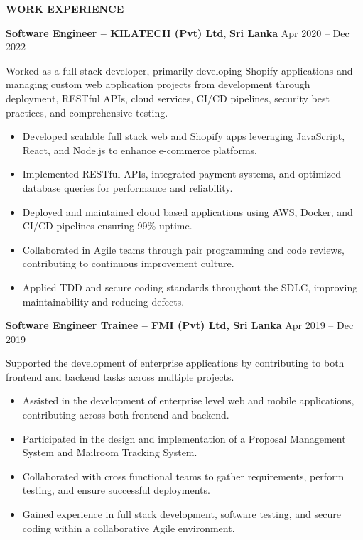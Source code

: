 \documentclass[10pt,letterpaper]{article}
\begin{document}
\textbf{WORK EXPERIENCE}

\vspace{1pt}

\textbf{Software Engineer -- KILATECH (Pvt) Ltd}, \textbf{Sri Lanka} \hfill Apr 2020 -- Dec 2022

\vspace{1pt}

Worked as a full stack developer, primarily developing Shopify applications and managing custom web application projects from development through deployment, RESTful APIs, cloud services, CI/CD pipelines, security best practices, and comprehensive testing.

\begin{itemize}
\item Developed scalable full stack web and Shopify apps leveraging JavaScript, React, and Node.js to enhance e-commerce platforms.
\item Implemented RESTful APIs, integrated payment systems, and optimized database queries for performance and reliability.
\item Deployed and maintained cloud based applications using AWS, Docker, and CI/CD pipelines ensuring 99\% uptime.
\item Collaborated in Agile teams through pair programming and code reviews, contributing to continuous improvement culture.
\item Applied TDD and secure coding standards throughout the SDLC, improving maintainability and reducing defects.
\end{itemize}

\textbf{Software Engineer Trainee -- FMI (Pvt) Ltd, Sri Lanka} \hfill Apr 2019 -- Dec 2019

\vspace{1pt}

Supported the development of enterprise applications by contributing to both frontend and backend tasks across multiple projects.

\begin{itemize}
\item Assisted in the development of enterprise level web and mobile applications, contributing across both frontend and backend.
\item Participated in the design and implementation of a Proposal Management System and Mailroom Tracking System.
\item Collaborated with cross functional teams to gather requirements, perform testing, and ensure successful deployments.
\item Gained experience in full stack development, software testing, and secure coding within a collaborative Agile environment.
\end{itemize}
\end{document}

